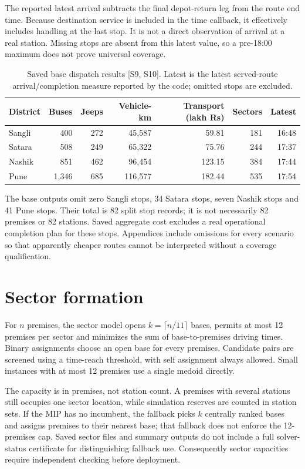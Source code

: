 \documentclass[11pt,a4paper,oneside]{report}
\newcommand{\source}[1]{\par\nopagebreak[4]{\footnotesize\color{teal}Evidence: #1.}\par}
\begin{document}
The reported latest arrival subtracts the final depot-return leg from the route end time. Because destination service is included in the time callback, it effectively includes handling at the last stop. It is not a direct observation of arrival at a real station. Missing stops are absent from this latest value, so a pre-18:00 maximum does not prove universal coverage.
\begin{table}[htbp]\centering
\small
\setlength{\tabcolsep}{5pt}
\caption{Saved base dispatch results [S9, S10]. Latest is the latest served-route arrival/completion measure reported by the code; omitted stops are excluded.}
\begin{tabular}{lrrrrrr}
\toprule
District & Buses & Jeeps & Vehicle-km & Transport (lakh Rs) & Sectors & Latest\\
\midrule
Sangli & 400 & 272 & 45,587 & 59.81 & 181 & 16:48\\
Satara & 508 & 249 & 65,322 & 75.76 & 244 & 17:37\\
Nashik & 851 & 462 & 96,454 & 123.15 & 384 & 17:44\\
Pune & 1,346 & 685 & 116,577 & 182.44 & 535 & 17:54\\
\bottomrule\end{tabular}
\end{table}
The base outputs omit zero Sangli stops, 34 Satara stops, seven Nashik stops and 41 Pune stops. Their total is 82 split stop records; it is not necessarily 82 premises or 82 stations. Saved aggregate cost excludes a real operational completion plan for these stops. Appendices include omissions for every scenario so that apparently cheaper routes cannot be interpreted without a coverage qualification.
\source{[S10]}

\section{Sector formation}
For $n$ premises, the sector model opens $k=\lceil n/11\rceil$ bases, permits at most 12 premises per sector and minimizes the sum of base-to-premises driving times. Binary assignments choose an open base for every premises. Candidate pairs are screened using a time-reach threshold, with self assignment always allowed. Small instances with at most 12 premises use a single medoid directly.

The capacity is in premises, not station count. A premises with several stations still occupies one sector location, while simulation reserves are counted in station sets. If the MIP has no incumbent, the fallback picks $k$ centrally ranked bases and assigns premises to their nearest base; that fallback does not enforce the 12-premises cap. Saved sector files and summary outputs do not include a full solver-status certificate for distinguishing fallback use. Consequently sector capacities require independent checking before deployment.
\source{[S10]}
\end{document}
